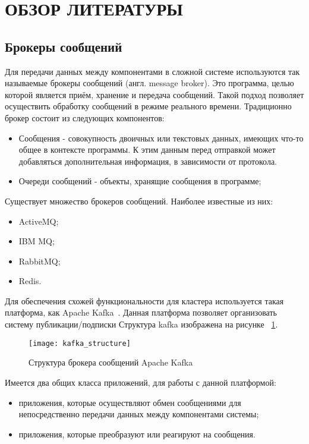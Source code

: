 \section{ОБЗОР ЛИТЕРАТУРЫ}
\label{sec:domain}

\subsection{Брокеры сообщений}

Для передачи данных между компонентами в сложной системе используются так называемые брокеры сообщений (англ. message broker).
Это программа, целью которой является приём, хранение и передача сообщений.
Такой подход позволяет осуществить обработку сообщений в режиме реального времени.
Традиционно брокер состоит из следующих компонентов:
\begin{itemize}
    \item Сообщения - совокупность двоичных или текстовых данных, имеющих что-то общее в контексте программы.
     К этим данным перед отправкой может добавляться дополнительная информация, в зависимости от протокола.
    \item Очереди сообщений - объекты, хранящие сообщения в программе;
\end{itemize}

Существует множество брокеров сообщений. Наиболее известные из них:
\begin{itemize}
    \item ActiveMQ;
    \item IBM MQ;
    \item RabbitMQ;
    \item Redis.
\end{itemize}

Для обеспечения схожей функциональности для кластера используется такая платформа, как Apache Kafka~\cite{kafka_documentation_intro}.
Данная платформа позволяет организовать систему публикации/подписки
Структура kafka изображена на рисунке ~\ref{pic:lit_review:kafka_structure}.

\begin{figure}
    \centering
    \texttt{[image: kafka\_structure]}
    \caption{Структура брокера сообщений  Apache Kafka~\cite{kafka_documentation_intro}}
    \label{pic:lit_review:kafka_structure}
\end{figure}

Имеется два общих класса приложений, для работы с данной платформой:
\begin{itemize}
    \item приложения, которые осуществляют обмен сообщениями для непосредственно передачи данных между компонентами системы;
    \item приложения, которые преобразуют или реагируют на сообщения.
\end{itemize}

